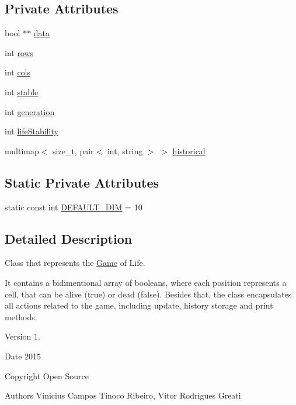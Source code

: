 \subsection*{Private Attributes}
\begin{DoxyCompactItemize}
\item 
bool $\ast$$\ast$ \hyperlink{classGameOfLife_a6e0a1d177ae3dd8c687ed766e57b3d36}{data}
\item 
int \hyperlink{classGameOfLife_a37d5c145e0ffc0b957988e8d5a0c910b}{rows}
\item 
int \hyperlink{classGameOfLife_a30e7fad7bbc05ad51404b84719b82bd2}{cols}
\item 
int \hyperlink{classGameOfLife_a59c0b43f3d368465d9473622fa8059f3}{stable}
\item 
int \hyperlink{classGameOfLife_aab1dc4078fe46596650d64ad50313555}{generation}
\item 
int \hyperlink{classGameOfLife_a0a05708cd58b7eadfd96d84a3641b835}{life\+Stability}
\item 
multimap$<$ size\+\_\+t, pair$<$ int, string $>$ $>$ \hyperlink{classGameOfLife_a3288a6c2face420e667f9ca31c302e00}{historical}
\end{DoxyCompactItemize}
\subsection*{Static Private Attributes}
\begin{DoxyCompactItemize}
\item 
static const int \hyperlink{classGameOfLife_a15976a2df224994b6fa2ca57242fd093}{D\+E\+F\+A\+U\+L\+T\+\_\+\+D\+IM} = 10
\end{DoxyCompactItemize}


\subsection{Detailed Description}
Class that represents the \hyperlink{classGame}{Game} of Life. 

It contains a bidimentional array of booleans, where each position represents a cell, that can be alive (true) or dead (false). Besides that, the class encapsulates all actions related to the game, including update, history storage and print methods. \begin{DoxyVersion}{Version}
1. 
\end{DoxyVersion}
\begin{DoxyDate}{Date}
2015 
\end{DoxyDate}
\begin{DoxyCopyright}{Copyright}
Open Source 
\end{DoxyCopyright}
\begin{DoxyAuthor}{Authors}
Vinicius Campos Tinoco Ribeiro, Vitor Rodrigues Greati 
\end{DoxyAuthor}


